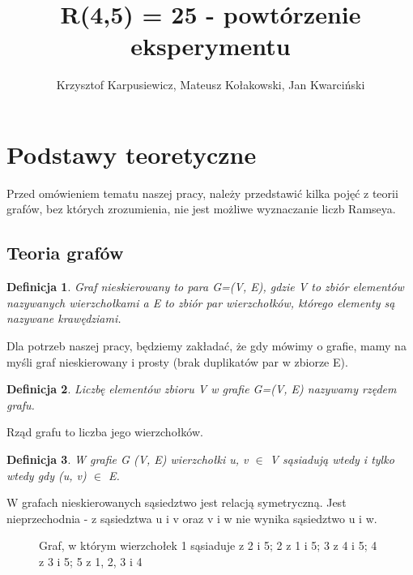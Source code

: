 \documentclass[11pt]{article}
\title{R(4,5) = 25 - powtórzenie eksperymentu}
\author{Krzysztof Karpusiewicz, Mateusz Kołakowski, Jan Kwarciński}
\newtheorem{definition}{Definicja}[section]
\begin{document}
\tableofcontents
\pagebreak

\section{Podstawy teoretyczne}

  Przed omówieniem tematu naszej pracy, należy przedstawić kilka pojęć z teorii grafów, bez których zrozumienia, nie jest możliwe wyznaczanie liczb Ramseya.

  \subsection{Teoria grafów}
  \begin{definition}
    Graf nieskierowany to para G=(V, E), gdzie V to zbiór elementów nazywanych wierzchołkami a E to zbiór par wierzchołków, którego elementy są nazywane krawędziami.
  \end{definition}

  Dla potrzeb naszej pracy, będziemy zakładać, że gdy mówimy o grafie, mamy na myśli graf nieskierowany i prosty (brak duplikatów par w zbiorze E).
  
  \begin{definition}
    Liczbę elementów zbioru V w grafie G=(V, E) nazywamy rzędem grafu. 
  \end{definition}

  Rząd grafu to liczba jego wierzchołków. 

  \begin{definition}
    W grafie G (V, E) wierzchołki u, v $\in$ V sąsiadują wtedy i tylko wtedy gdy (u, v) $\in$ E.    
  \end{definition}
  W grafach nieskierowanych sąsiedztwo jest relacją symetryczną. Jest nieprzechodnia - z sąsiedztwa u i v oraz v i w nie wynika sąsiedztwo u i w. \linebreak

  \begin{figure}[h]
    \centering
    \caption{Graf, w którym wierzchołek 1 sąsiaduje z 2 i 5; 2 z 1 i 5; 3 z 4 i 5; 4 z 3 i 5; 5 z 1, 2, 3 i 4 }
  \end{figure}
\end{document}
